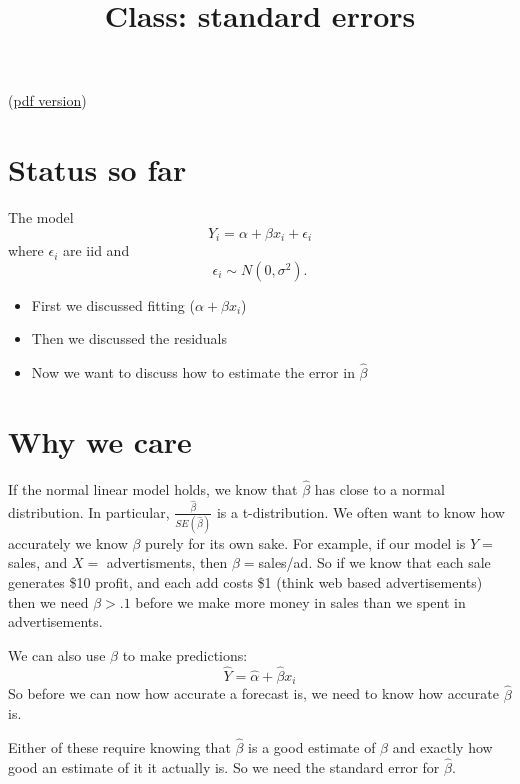 \documentclass{article} %
\begin{document}
\title{Class: standard errors}


(\href{class_standard_errors.pdf}{pdf version})


\section{Status so far}

The model
\begin{displaymath}
Y_i = \alpha + \beta x_i + \epsilon_i 
\end{displaymath}
where $\epsilon_i$ are iid and
\begin{displaymath}
\epsilon_i \sim N(0,\sigma^2).
\end{displaymath}

\begin{itemize}
\item First we discussed fitting ($\alpha + \beta x_i$)
\item Then we discussed the residuals
\item Now we want to discuss how to estimate the error in $\hat\beta$
\end{itemize}

\section{Why we care}

If the normal linear model holds, we know that $\hat\beta$ has close
to a normal distribution.  In particular,
$\frac{\hat\beta}{SE(\hat\beta)}$ is a t-distribution.  We often want
to know how accurately we know $\beta$ purely for its own sake.  For
example, if our model is $Y = $ sales, and $X = $ advertisments, then
$\beta = $sales/ad.  So if we know that each sale generates \$10
profit, and each add costs \$1 (think web based advertisements) then
we need $\beta > .1$ before we make more money in sales than we spent
in advertisements.  

We can also use $\hat\beta$ to make predictions:
\begin{displaymath}
\hat{Y} = \hat\alpha + \hat\beta x_i
\end{displaymath}
 So before we can now how accurate a forecast is, we need to know how
accurate $\hat\beta$ is.

Either of these require knowing that $\hat\beta$ is a good estimate of
$\beta$ and exactly how good an estimate of it it actually is.  So we
need the standard error for $\hat\beta$.
\end{document}
